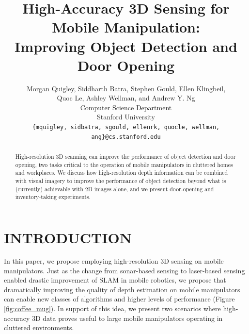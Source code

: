 \documentclass[letterpaper, 10 pt, conference]{ieeeconf}  %
\title{\LARGE \bf High-Accuracy 3D Sensing for Mobile Manipulation:\\Improving Object Detection and Door Opening}
\author{ \parbox{6.5in}{\centering Morgan Quigley, Siddharth Batra, Stephen Gould, Ellen Klingbeil,\\Quoc Le, Ashley Wellman, and Andrew Y. Ng\\
         Computer Science Department\\
         Stanford University\\
         {\tt\scriptsize\{mquigley, sidbatra, sgould, ellenrk, quocle, wellman, ang\}@cs.stanford.edu}}
}
\begin{document}
\maketitle
\thispagestyle{empty}
\pagestyle{empty}


\begin{abstract}

High-resolution 3D scanning can improve the performance of object detection and
door opening, two tasks critical to the operation of mobile manipulators in
cluttered homes and workplaces. We discuss how high-resolution depth
information can be combined with visual imagery to improve the performance
of object detection beyond what is (currently) achievable with 2D images alone,
and we present door-opening and inventory-taking experiments.

\end{abstract}


\section{INTRODUCTION}



In this
paper, we propose employing high-resolution 3D sensing on mobile manipulators.
Just as the change from sonar-based sensing to laser-based sensing enabled
drastic improvement of SLAM in mobile robotics, we propose that dramatically
improving the quality of depth estimation on mobile manipulators can enable new
classes of algorithms and higher levels of performance (Figure
\ref{fig:coffee_mug}).  In support of this idea, we present two scenarios
where high-accuracy 3D data proves useful to large mobile manipulators
operating in cluttered environments.
\end{document}

